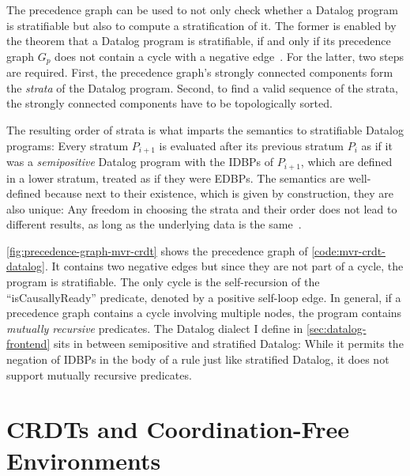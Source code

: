 The precedence graph can be used to not only check whether a Datalog
program is stratifiable but also to compute a stratification of it.
The former is enabled by the theorem that a Datalog program is stratifiable,
if and only if its precedence graph \(G_p\) does not contain a cycle
with a negative edge~\cite{green2013datalog}.
For the latter, two steps are required.
First, the precedence graph's strongly connected components form the
\emph{strata} of the Datalog program.
Second, to find a valid sequence of the strata,
the strongly connected components have to be topologically sorted.

The resulting order of strata is what imparts the semantics to stratifiable
Datalog programs:
Every stratum \(P_{i+1}\) is evaluated after its previous stratum \(P_{i}\)
as if it was a \emph{semipositive} Datalog program with the \acp{IDBP}
of \(P_{i+1}\), which are defined in a lower stratum,
treated as if they were \acp{EDBP}.
The semantics are well-defined because next to their existence,
which is given by construction, they are also unique: Any freedom
in choosing the strata and their order does not lead to different results,
as long as the underlying data is the same~\cite{apt1988towards}.



\ref{fig:precedence-graph-mvr-crdt} shows the precedence graph
of \ref{code:mvr-crdt-datalog}.
It contains two negative edges but since they are not part of a cycle,
the program is stratifiable.
The only cycle is the self-recursion of the ``isCausallyReady'' predicate,
denoted by a positive self-loop edge.
In general, if a precedence graph contains a cycle involving multiple nodes,
the program contains \emph{mutually recursive} predicates.
The Datalog dialect I define in \ref{sec:datalog-frontend} sits in between
semipositive and stratified Datalog:
While it permits the negation of \acp{IDBP} in the body of a rule just like
stratified Datalog, it does not support mutually recursive predicates.

\section{\acsp{CRDT} and Coordination-Free Environments}\label{sec:crdt-coordination-free}

